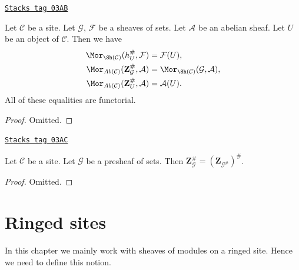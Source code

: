 \begin{lemma}
\label{sites-modules-lemma-obvious-adjointness-sheaves}
\href{https://stacks.math.columbia.edu/tag/03AB}{\texttt{Stacks tag 03AB}}

Let $\mathcal{C}$ be a site.
Let $\mathcal{G}$, $\mathcal{F}$ be a sheaves of sets.
Let $\mathcal{A}$ be an abelian sheaf.
Let $U$ be an object of $\mathcal{C}$. Then
we have
\begin{align*}
\Mor_{\Sh(\mathcal{C})}(h_U^\#, \mathcal{F})
& =
\mathcal{F}(U), \\
\Mor_{\textit{Ab}(\mathcal{C})}(\mathbf{Z}_\mathcal{G}^\#,
\mathcal{A})
& =
\Mor_{\Sh(\mathcal{C})}(\mathcal{G}, \mathcal{A}), \\
\Mor_{\textit{Ab}(\mathcal{C})}(\mathbf{Z}_U^\#, \mathcal{A})
& =
\mathcal{A}(U).
\end{align*}
All of these equalities are functorial.
\end{lemma}

\begin{proof}
Omitted.
\end{proof}

\begin{lemma}
\label{sites-modules-lemma-may-sheafify-before-abelianize}
\href{https://stacks.math.columbia.edu/tag/03AC}{\texttt{Stacks tag 03AC}}

Let $\mathcal{C}$ be a site.
Let $\mathcal{G}$ be a presheaf of sets.
Then $\mathbf{Z}_\mathcal{G}^\# = (\mathbf{Z}_{\mathcal{G}^\#})^\#$.
\end{lemma}

\begin{proof}
Omitted.
\end{proof}

\section{Ringed sites}
\label{sites-modules-section-ringed-sites}
In this chapter we mainly work with sheaves of modules on a ringed site.
Hence we need to define this notion.


